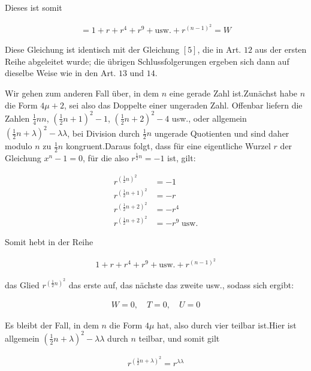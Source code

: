 Dieses ist somit

\[
\begin{aligned}
=1+r+r^4+r^9+\text{usw.}+r^{(n-1)^2}=W
\end{aligned}
\]

Diese Gleichung ist identisch mit der Gleichung $[5]$, die in Art. $12$ aus der ersten Reihe abgeleitet wurde; die übrigen Schlussfolgerungen ergeben sich dann auf dieselbe Weise wie in den Art. $13$ und $14$.



Wir gehen zum anderen Fall über, in dem $n$ eine gerade Zahl ist.\quad Zunächst habe $n$ die Form $4\mu+2$, sei also das Doppelte einer ungeraden Zahl. Offenbar liefern die Zahlen $\frac14nn$, $(\frac12n+1)^2-1$, $(\frac12n+2)^2-4$ usw., oder allgemein $(\frac12n+\lambda)^2-\lambda\lambda$, bei Division durch $\frac12n$ ungerade Quotienten und sind daher modulo $n$ zu $\frac12n$ kongruent.\quad Daraus folgt, dass für eine eigentliche Wurzel $r$ der Gleichung $x^n-1=0$, für die also $r^{\frac12n}=-1$ ist, gilt:

\[
\begin{aligned}
r^{(\frac12n)^2}&=-1\\
r^{(\frac12n+1)^2}&=-r\\
r^{(\frac12n+2)^2}&=-r^4\\
r^{(\frac12n+2)^2}&=-r^9\;\text{usw.}
\end{aligned}
\]

Somit hebt in der Reihe

\[
\begin{aligned}
1+r+r^4+r^9+\text{usw.}+r^{(n-1)^2}
\end{aligned}
\]

das Glied $r^{(\frac12n)^2}$ das erste auf, das nächste das zweite usw., sodass sich ergibt:

\[
\begin{aligned}
W=0,\quad T=0,\quad U=0
\end{aligned}
\]


Es bleibt der Fall, in dem $n$ die Form $4\mu$ hat, also durch vier teilbar ist.\quad Hier ist allgemein $(\frac12n+\lambda)^2-\lambda\lambda$ durch $n$ teilbar, und somit gilt

\[
\begin{aligned}
r^{(\frac12n+\lambda)^2}=r^{\lambda\lambda}
\end{aligned}
\]

